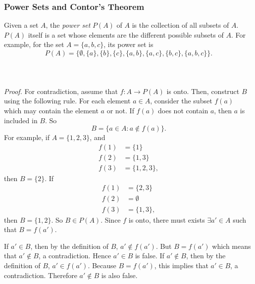 \documentclass{article}
\begin{document}
        \subsubsection{Power Sets and Contor's Theorem}
            Given a set $A$, the \textit{power set} $P(A)$ of $A$ is the collection of all subsets of $A$. $P(A)$ itself is a set whose elements are the different possible subsets of $A$. For example, for the set $A = \{a,b,c\}$, its power set is
            \begin{equation*}
                P(A) = \{\emptyset,\{a\},\{b\},\{c\},\{a,b\},\{a,c\},\{b,c\},\{a,b,c\}\}.
            \end{equation*}
            \\
            \\ \\
            \textit{Proof.} For contradiction, assume that $f:A \to P(A)$ is onto. Then, construct $B$ using the following rule. For each element $a \in A$, consider the subset $f(a)$ which may contain the element $a$ or not. If $f(a)$ does not contain $a$, then $a$ is included in $B$. So
            \begin{equation*}
                B = \{a \in A: a \notin f(a)\}.
            \end{equation*}
            For example, if $A = \{1,2,3\}$, and 
            \begin{align*}
                f(1) & = \{1\}\\
                f(2) & = \{1,3\}\\
                f(3) & = \{1,2,3\},
            \end{align*}
             then $B=\{2\}$. If 
             \begin{align*}
                f(1) & = \{2,3\}\\
                f(2) & = \emptyset\\
                f(3) & = \{1,3\},
            \end{align*}
            then $B=\{1,2\}$.
            So $B \in P(A)$. Since $f$ is onto, there must exists $\exists a' \in A$ such that $B = f(a')$.
            
            If $a' \in B$, then by the definition of $B$, $a' \notin f(a')$. But $B = f(a')$ which means that $a' \notin B$, a contradiction. Hence $a' \in B$ is false. If $a' \notin B$, then by the definition of $B$, $a' \in f(a')$. Because $B = f(a')$, this implies that $a' \in B$, a contradiction. Therefore $a' \notin B$ is also false.
            
\end{document}
